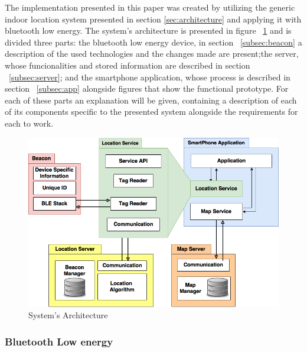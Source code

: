 \documentclass[a4paper]{IEEEtran}
\begin{document}
The implementation presented in this paper was created by utilizing the generic indoor location system presented in section \ref{sec:architecture} and applying it with bluetooth low energy. The system's architecture is presented in figure ~\ref{fig:implementation} and is divided three parts: the bluetooth low energy device, in section ~\ref{subsec:beacon} a description of the used technologies and the changes made are present;the server, whose funcionalities and stored information are described in section ~\ref{subsec:server}; and the smartphone application, whose process is described in section ~\ref{subsec:app} alongside figures that show the functional prototype. For each of these parts an explanation will be given, containing a description of each of its components specific to the presented system alongside the requirements for each to work.

\begin{figure}
	\centering
		\includegraphics[width=1\linewidth]{figures/implementation.png}
	\caption[System's Architecture]{System's Architecture}
	\label{fig:implementation}
\end{figure}

\subsubsection{Bluetooth Low energy}
\label{ble}
\end{document}
